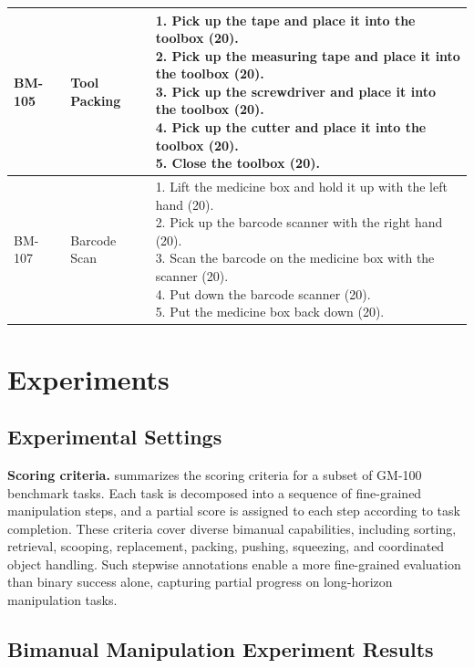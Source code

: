 \begin{table}[ht!]
\begin{tabular}{p{} p{} p{}}
BM-105 & Tool Packing &
\makecell[l]{
1. Pick up the tape and place it into the toolbox (20). \\
2. Pick up the measuring tape and place it into the toolbox (20). \\
3. Pick up the screwdriver and place it into the toolbox (20). \\
4. Pick up the cutter and place it into the toolbox (20). \\
5. Close the toolbox (20).
} \\
\midrule

BM-107 & Barcode Scan &
\makecell[l]{
1. Lift the medicine box and hold it up with the left hand (20). \\
2. Pick up the barcode scanner with the right hand (20). \\
3. Scan the barcode on the medicine box with the scanner (20). \\
4. Put down the barcode scanner (20). \\
5. Put the medicine box back down (20).
} \\

\bottomrule
\end{tabular}
\end{table}

\section{Experiments}\label{sec:exp}

\subsection{Experimental Settings}

\noindent\textbf{Scoring criteria.} 
 summarizes the scoring criteria for a subset of GM-100 benchmark tasks. Each task is decomposed into a sequence of fine-grained manipulation steps, and a partial score is assigned to each step according to task completion. These criteria cover diverse bimanual capabilities, including sorting, retrieval, scooping, replacement, packing, pushing, squeezing, and coordinated object handling. Such stepwise annotations enable a more fine-grained evaluation than binary success alone, capturing partial progress on long-horizon manipulation tasks.

\subsection{Bimanual Manipulation Experiment Results}

